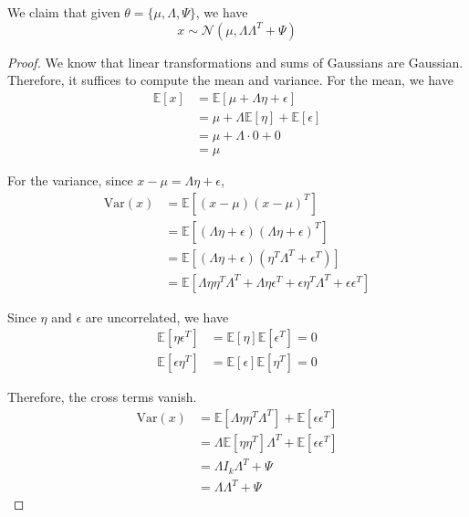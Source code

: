   \begin{lemma}
    \label{thm:marginal-distribution-of-linear-gaussian-factor}
    We claim that given $\theta = \{\mu, \Lambda, \Psi\}$, we have
    \begin{equation}
      x \sim \mathcal{N}(\mu, \Lambda \Lambda^T + \Psi)
    \end{equation}
  \end{lemma}
  \begin{proof}
    We know that linear transformations and sums of Gaussians are Gaussian. Therefore, it suffices to compute the mean and variance. For the mean, we have 
    \begin{align}
      \mathbb{E}[x] &= \mathbb{E}[\mu + \Lambda \eta + \epsilon] \\
      &= \mu + \Lambda \mathbb{E}[\eta] + \mathbb{E}[\epsilon] \\
      &= \mu + \Lambda \cdot 0 + 0 \\
      &= \mu
    \end{align}

    For the variance, since $x - \mu = \Lambda \eta +  \epsilon$, 
    \begin{align}
      \text{Var}(x) &= \mathbb{E}[(x - \mu)(x - \mu)^T] \\
      &= \mathbb{E}[(\Lambda \eta + \epsilon)(\Lambda \eta + \epsilon)^T] \\
      &= \mathbb{E}[(\Lambda \eta + \epsilon)(\eta^T \Lambda^T + \epsilon^T)] \\
      &= \mathbb{E}[\Lambda \eta \eta^T \Lambda^T + \Lambda \eta  \epsilon^T + \epsilon \eta^T \Lambda^T + \epsilon \epsilon^T ]
    \end{align}
    
    Since $\eta$ and $\epsilon$ are uncorrelated, we have 
    \begin{align}
      \mathbb{E}[\eta \epsilon^T] &= \mathbb{E}[\eta]\mathbb{E}[\epsilon^T] = 0 \\
      \mathbb{E}[\epsilon \eta^T] &= \mathbb{E}[\epsilon]\mathbb{E}[\eta^T] = 0
    \end{align}
    
    Therefore, the cross terms vanish. 
    \begin{align}
      \text{Var}(x) &= \mathbb{E}[\Lambda \eta \eta^T \Lambda^T] + \mathbb{E}[\epsilon \epsilon^T] \\
      &= \Lambda \mathbb{E}[\eta \eta^T] \Lambda^T + \mathbb{E}[\epsilon \epsilon^T] \\ 
      &= \Lambda I_k \Lambda^T + \Psi \\
      &= \Lambda \Lambda^T + \Psi
    \end{align}
  \end{proof}

